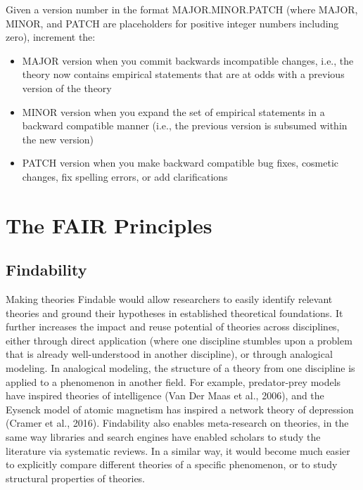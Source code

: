 \documentclass[
  man, noextraspace,floatsintext]{apa7}
\providecommand{\tightlist}{%
  \setlength{\itemsep}{0pt}\setlength{\parskip}{0pt}}
\begin{document}
Given a version number in the format MAJOR.MINOR.PATCH (where MAJOR, MINOR, and PATCH are placeholders for positive integer numbers including zero), increment the:

\begin{itemize}
\tightlist
\item
  MAJOR version when you commit backwards incompatible changes, i.e., the
  theory now contains empirical statements that are at odds with
  a previous version of the theory
\item
  MINOR version when you expand the set of empirical statements in a
  backward compatible manner (i.e., the previous version is
  subsumed within the new version)
\item
  PATCH version when you make backward compatible bug fixes, cosmetic
  changes, fix spelling errors, or add clarifications
\end{itemize}

\section{The FAIR Principles}\label{the-fair-principles}

\subsection{Findability}\label{findability}

Making theories Findable would allow researchers to easily identify relevant theories
and ground their hypotheses in established theoretical foundations.
It further increases the impact and reuse potential of theories across disciplines,
either through direct application (where one discipline stumbles upon a problem that is already well-understood in another discipline),
or through analogical modeling.
In analogical modeling, the structure of a theory from one discipline is applied to a phenomenon in another field.
For example, predator-prey models have inspired theories of intelligence (Van Der Maas et al., 2006), and the Eysenck model of atomic magnetism has inspired a network theory of depression (Cramer et al., 2016).
Findability also enables meta-research on theories,
in the same way libraries and search engines have enabled scholars to study the literature via systematic reviews.
In a similar way, it would become much easier to explicitly compare different theories of a specific phenomenon,
or to study structural properties of theories.
\end{document}
